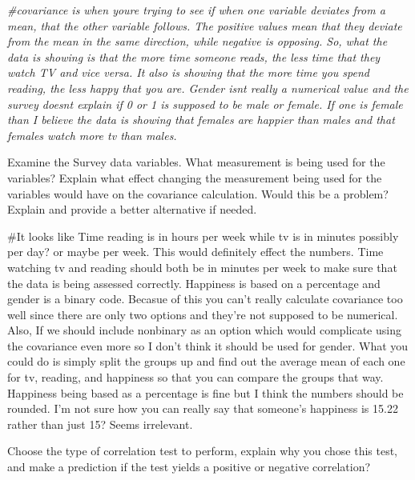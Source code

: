 \documentclass[
]{article}
\newenvironment{Shaded}{\begin{snugshade}}{\end{snugshade}}
\newcommand{\AttributeTok}[1]{\textcolor[rgb]{0.77,0.63,0.00}{#1}}
\newcommand{\CommentTok}[1]{\textcolor[rgb]{0.56,0.35,0.01}{\textit{#1}}}
\newcommand{\FunctionTok}[1]{\textcolor[rgb]{0.00,0.00,0.00}{#1}}
\newcommand{\NormalTok}[1]{#1}
\newcommand{\SpecialCharTok}[1]{\textcolor[rgb]{0.00,0.00,0.00}{#1}}
\newcommand{\StringTok}[1]{\textcolor[rgb]{0.31,0.60,0.02}{#1}}
\begin{document}
\begin{Shaded}
\begin{Highlighting}[]
\CommentTok{\#covariance is when you\textquotesingle{}re trying to see if when one variable deviates from a mean, that the other variable follows. The positive values mean that they deviate from the mean in the same direction, while negative is opposing. So, what the data is showing is that the more time someone reads, the less time that they watch TV and vice versa. It also is showing that the more time you spend reading, the less happy that you are. Gender isn\textquotesingle{}t really a numerical value and the survey doesn\textquotesingle{}t explain if 0 or 1 is supposed to be male or female.   If one is female than I believe the data is showing that females are happier than males and that females watch more tv than males. }
\end{Highlighting}
\end{Shaded}

Examine the Survey data variables. What measurement is being used for
the variables? Explain what effect changing the measurement being used
for the variables would have on the covariance calculation. Would this
be a problem? Explain and provide a better alternative if needed.

\#It looks like Time reading is in hours per week while tv is in minutes
possibly per day? or maybe per week. This would definitely effect the
numbers. Time watching tv and reading should both be in minutes per week
to make sure that the data is being assessed correctly. Happiness is
based on a percentage and gender is a binary code. Becasue of this you
can't really calculate covariance too well since there are only two
options and they're not supposed to be numerical. Also, If we should
include nonbinary as an option which would complicate using the
covariance even more so I don't think it should be used for gender. What
you could do is simply split the groups up and find out the average mean
of each one for tv, reading, and happiness so that you can compare the
groups that way. Happiness being based as a percentage is fine but I
think the numbers should be rounded. I'm not sure how you can really say
that someone's happiness is 15.22 rather than just 15? Seems irrelevant.

Choose the type of correlation test to perform, explain why you chose
this test, and make a prediction if the test yields a positive or
negative correlation?

\begin{Shaded}
\end{Shaded}
\end{document}
